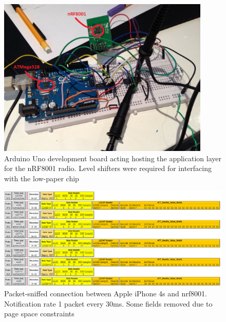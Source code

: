 \documentclass[]{article}
\begin{document}
\begin{figure}[H]
	\begin{center}
		\includegraphics[width = 0.9\textwidth]{nrf8001}
	\end{center}
	\caption{Arduino Uno development board acting hosting the application layer for the nRF8001 radio. Level shifters were required for interfacing with the low-paper chip}
	\label{fig:nrf8001}
\end{figure}

\begin{figure}[H]
	\begin{center}
		\includegraphics[width = 1.4\textwidth, angle=90]{nrfcap}
	\end{center}
	\caption{Packet-sniffed connection between Apple iPhone 4s and nrf8001. Notification rate 1 packet every 30ms. Some fields removed due to page space constraints}
	\label{fig:nrfcap}
\end{figure}
\end{document}
